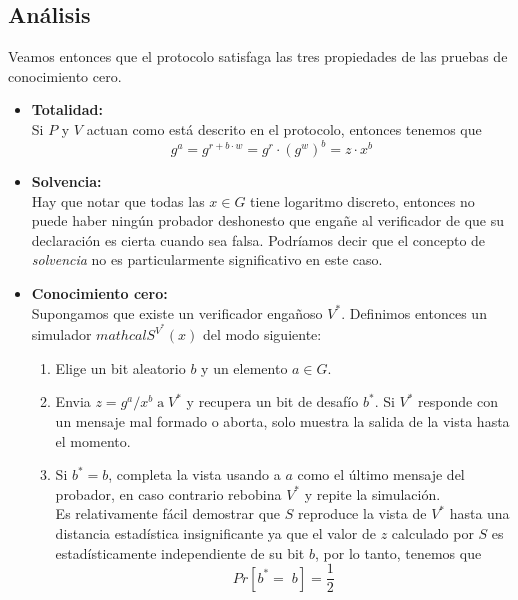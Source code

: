 \documentclass[oneside,10pt]{article}
\begin{document}
\subsection{Análisis}
Veamos entonces que el protocolo satisfaga las tres propiedades de las pruebas de conocimiento cero.
\begin{itemize}
\item \textbf{Totalidad:}\\
  Si $P$ y $V$ actuan como está descrito en el protocolo, entonces tenemos que
  \[g^a = g^{r+b \cdot w} = g ^r \cdot (g^w)^b = z \cdot x^b \]
\item \textbf{Solvencia:}\\
  Hay que notar que todas las $x \in G$ tiene logaritmo discreto, entonces no puede haber ningún probador deshonesto que engañe al verificador de que su declaración es cierta cuando sea falsa. Podríamos decir que el concepto de \emph{solvencia} no es particularmente significativo en este caso.
\item \textbf{Conocimiento cero:}\\
  Supongamos que existe un verificador engañoso $V^*$. Definimos entonces un simulador $mathcal{S}^{V^*}(x)$ del modo siguiente:
  \begin{enumerate}
  \item Elige un bit aleatorio $b$ y un elemento $a \in G$.
  \item Envia $z = g^a/x^b \;\mathrm{a}\; V^*$ y recupera un bit de desafío $b^*$. Si $V^*$ responde con un mensaje mal formado o aborta, solo muestra la salida de la vista hasta el momento.
  \item Si $b^* = b$, completa la vista usando a $a$ como el último mensaje del probador, en caso contrario rebobina $V^*$ y repite la simulación.\\

    Es relativamente fácil demostrar que $S$ reproduce la vista de $V^*$ hasta una distancia estadística insignificante ya que el valor de $z$ calculado por $S$ es estadísticamente independiente de su bit $b$, por lo tanto, tenemos que \[Pr[b^* = \; b ] = \frac{1}{2}\] 
  \end{enumerate}
\end{itemize}
\end{document}

